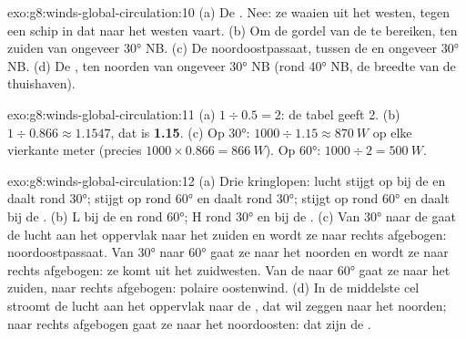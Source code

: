 \begin{solution}{exo:g8:winds-global-circulation:10}
(a) De . Nee: ze waaien uit het westen, tegen een schip in dat
naar het westen vaart. (b) Om de gordel van de  te bereiken,
ten zuiden van ongeveer \ang{30} NB. (c) De noordoostpassaat, tussen de
 en ongeveer \ang{30} NB. (d) De , ten noorden van
ongeveer \ang{30} NB (rond \ang{40} NB, de breedte van de thuishaven).
\end{solution}

\begin{solution}{exo:g8:winds-global-circulation:11}
(a) $1 \div 0.5 = 2$: de tabel geeft 2. (b) $1 \div 0.866 \approx
1.1547$, dat is \textbf{1.15}. (c) Op \ang{30}: $1000 \div 1.15 \approx
\qty{870}{W}$ op elke vierkante meter (precies $1000 \times 0.866 =
\qty{866}{W}$). Op \ang{60}: $1000 \div 2 = \qty{500}{W}$.
\end{solution}

\begin{solution}{exo:g8:winds-global-circulation:12}
(a) Drie kringlopen: lucht stijgt op bij de  en daalt rond \ang{30};
stijgt op rond \ang{60} en daalt rond \ang{30}; stijgt op rond \ang{60} en
daalt bij de . (b) L bij de  en rond \ang{60}; H rond \ang{30} en
bij de . (c) Van \ang{30} naar de  gaat de lucht aan het
oppervlak naar het zuiden en wordt ze naar rechts afgebogen:
noordoostpassaat. Van \ang{30} naar \ang{60} gaat ze naar het noorden en
wordt ze naar rechts afgebogen: ze komt uit het zuidwesten. Van de  naar
\ang{60} gaat ze naar het zuiden, naar rechts afgebogen: polaire
oostenwind. (d) In de middelste cel stroomt de lucht aan het oppervlak naar
de , dat wil zeggen naar het noorden; naar rechts afgebogen gaat ze
naar het noordoosten: dat zijn de .
\end{solution}

